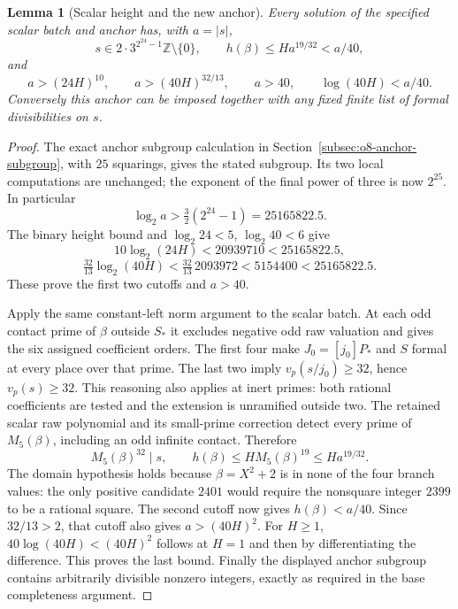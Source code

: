 \documentclass[11pt]{article}
\newtheorem{lemma}[theorem]{Lemma}
\theoremstyle{definition}
\theoremstyle{remark}
\newcommand{\Z}{\mathbb Z}
\begin{document}
\begin{lemma}[Scalar height and the new anchor]
\label{lem:quartic-height19-anchor}
Every solution of the specified scalar batch and anchor has, with
$a=|s|$,
\[
 s\in2\cdot3^{2^{24}-1}\Z\setminus\{0\},\qquad
 h(\beta)\le H a^{19/32}<a/40,
\]
and
\begin{equation}\label{eq:quartic-cutoffs19}
 a>(24H)^{10},\qquad a>(40H)^{32/13},\qquad
 a>40,\qquad \log(40H)<a/40.
\end{equation}
Conversely this anchor can be imposed together with any fixed finite
list of formal divisibilities on $s$.
\end{lemma}
\begin{proof}
The exact anchor subgroup calculation in
Section~\ref{subsec:o8-anchor-subgroup}, with $25$ squarings, gives the
stated subgroup. Its two local computations are unchanged; the exponent
of the final power of three is now $2^{25}$.
In particular
\[
 \log_2 a>\tfrac32(2^{24}-1)=25165822.5.
\]
The binary height bound and $\log_2 24<5$, $\log_2 40<6$ give
\[
 10\log_2(24H)<20939710<25165822.5,
\]
\[
 \tfrac{32}{13}\log_2(40H)
 <\tfrac{32}{13}\,2093972<5154400<25165822.5.
\]
These prove the first two cutoffs and $a>40$.

Apply the same constant-left norm argument to the scalar batch. At each
odd contact prime of $\beta$ outside $S_*$ it excludes negative odd raw
valuation and gives the six assigned coefficient orders. The first four
make $J_0=[j_0]P_*$ and $S$ formal at every place over that prime. The
last two imply $v_p(s/j_0)\ge32$, hence $v_p(s)\ge32$. This reasoning
also applies at inert primes: both rational coefficients are tested and
the extension is unramified outside two. The retained scalar raw
polynomial and its small-prime correction detect every prime of
$M_5(\beta)$, including an odd infinite contact. Therefore
\[
 M_5(\beta)^{32}\mid s,
 \qquad h(\beta)\le H M_5(\beta)^{19}\le Ha^{19/32}.
\]
The domain hypothesis holds because $\beta=X^2+2$ is in none of the four
branch values: the only positive candidate $2401$ would require the
nonsquare integer $2399$ to be a rational square. The second cutoff
now gives $h(\beta)<a/40$.
Since $32/13>2$, that cutoff also gives $a>(40H)^2$.
For $H\ge1$, $40\log(40H)<(40H)^2$ follows at $H=1$ and then by
differentiating the difference. This proves the last bound.
Finally the displayed anchor subgroup contains arbitrarily divisible
nonzero integers, exactly as required in the base completeness argument.
\end{proof}
\end{document}
